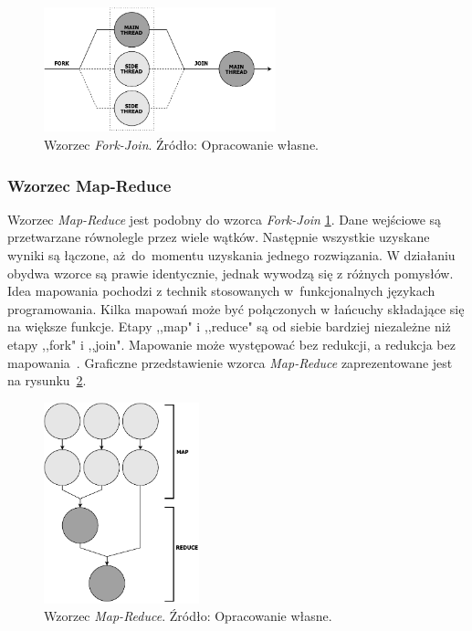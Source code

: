 \documentclass[12pt]{article}
\begin{document}
\begin{figure}[H]
    \centering
	\includegraphics[width=0.6\textwidth]{patterns-fork-join.pdf}
    \caption{Wzorzec \textit{Fork-Join}. Źródło: Opracowanie własne.}
    \label{fig:fork-join}
\end{figure}

\subsubsection{Wzorzec Map-Reduce}
Wzorzec \textit{Map-Reduce} jest podobny do wzorca \textit{Fork-Join} \ref{fig:fork-join}. Dane wejściowe są przetwarzane równolegle przez wiele wątków.
Następnie wszystkie uzyskane wyniki są łączone, aż~do~momentu uzyskania jednego rozwiązania.
W działaniu obydwa wzorce są prawie identycznie, jednak wywodzą się z różnych pomysłów.
Idea mapowania pochodzi z technik stosowanych w~funkcjonalnych językach programowania.
Kilka mapowań może być połączonych w łańcuchy składające się na większe funkcje.
Etapy ,,map" i ,,reduce" są od siebie bardziej niezależne niż etapy ,,fork" i ,,join".
Mapowanie może występować bez redukcji, a redukcja bez mapowania~\cite{parallel-design-patterns}.
Graficzne przedstawienie wzorca \textit{Map-Reduce} zaprezentowane jest na rysunku~\ref{fig:map-reduce}.

\begin{figure}[H]
    \centering
	\includegraphics[width=0.4\textwidth]{patterns-map-reduce.pdf}
    \caption{Wzorzec \textit{Map-Reduce}. Źródło: Opracowanie własne.}
    \label{fig:map-reduce}
\end{figure}
\end{document}
